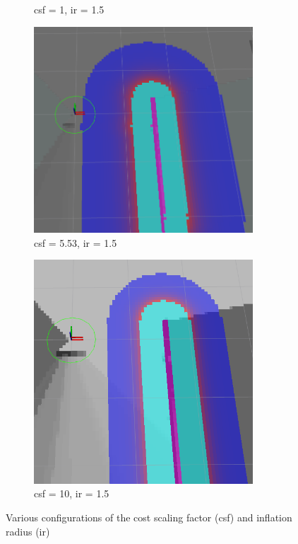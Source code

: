 \documentclass[capstone_report.tex]{subfiles}
\begin{document}
\begin{figure}[H]
\begin{subfigure}{0.33\textwidth}
        \caption{csf = 1, ir = 1.5}
    \end{subfigure}%
    \begin{subfigure}{0.33\textwidth}
        \centering
        \includegraphics[width=0.9\textwidth]{imgs/lcm/lcm_csf_553_ir_15.png}
        \caption{csf = 5.53, ir = 1.5}
    \end{subfigure}
    \begin{subfigure}{0.33\textwidth}
        \centering
        \includegraphics[width=0.9\textwidth]{imgs/lcm/lcm_csf_10_ir_15.png}
        \caption{csf = 10, ir = 1.5}
    \end{subfigure}
    \caption{Various configurations of the cost scaling factor (csf) and inflation radius (ir)}\label{fig:costmap_config}
\end{figure}
\end{document}
